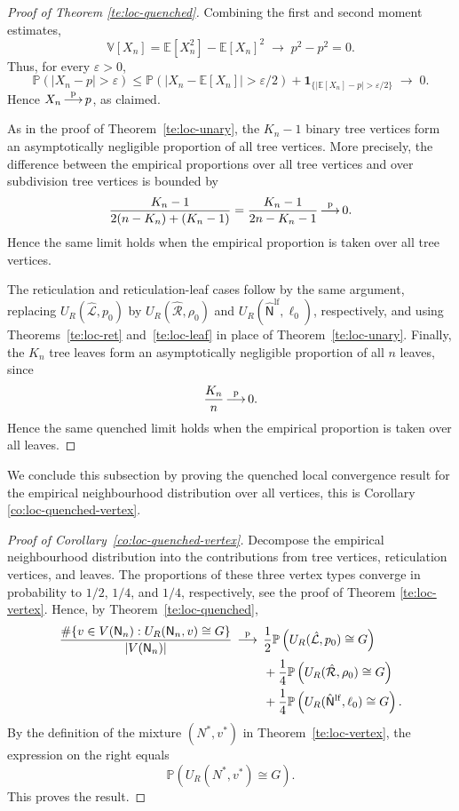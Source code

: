 \documentclass[english,11pt]{smfart}
\newcommand{\Prb}[1]{\mathbb{P}\left(#1\right)}
\newcommand{\Ex}[1]{\mathbb{E}[#1]}
\newcommand{\Va}[1]{\mathbb{V}[#1]}
\newcommand{\convp}{\,{\buildrel \mathrm{p} \over \longrightarrow}\,}
\newcommand{\cL}{\mathcal{L}}
\newcommand{\cR}{\mathcal{R}}
\newcommand{\mN}{\mathsf{N}}
\numberwithin{equation}{section}
\begin{document}
\begin{proof}[Proof of Theorem \ref{te:loc-quenched}]
Combining the first and second moment estimates,
\[
  \Va{X_n}
  =
  \Ex{X_n^2}-\Ex{X_n}^2
  \;\longrightarrow\;p^2-p^2=0.
\]
Thus, for every \(\varepsilon>0\),
\[
  \Prb{|X_n-p|>\varepsilon}
  \le
  \Prb{|X_n-\Ex{X_n}|>\varepsilon/2}
  +
  \mathbf{1}_{\{|\Ex{X_n}-p|>\varepsilon/2\}}
  \;\longrightarrow\;0.
\]
Hence \(X_n\convp p\), as claimed.
\smallskip

As in the proof of Theorem~\ref{te:loc-unary}, the \(K_n-1\) binary tree
vertices form an asymptotically negligible proportion of all tree
vertices. More precisely, the difference between the empirical
proportions over all tree vertices and over subdivision tree vertices is
bounded by
\[
\frac{K_n-1}{2(n-K_n)+(K_n-1)}
=
\frac{K_n-1}{2n-K_n-1}
\convp0.
\]
Hence the same limit holds when the empirical proportion is taken over all
tree vertices.
\smallskip

The reticulation and reticulation-leaf cases follow by the same argument,
replacing \(U_R(\hat{\cL},p_0)\) by \(U_R(\hat{\cR},\rho_0)\) and
\(U_R(\hat{\mN}^{\mathrm{lf}},\ell_0)\), respectively, and using
Theorems~\ref{te:loc-ret} and~\ref{te:loc-leaf} in place of
Theorem~\ref{te:loc-unary}. Finally, the \(K_n\) tree leaves form an
asymptotically negligible proportion of all \(n\) leaves, since
\[
\frac{K_n}{n}\convp0.
\]
Hence the same quenched limit holds when the empirical proportion is taken
over all leaves.
\end{proof}

We conclude this subsection by proving the quenched local convergence
result for the empirical neighbourhood distribution over all vertices, this is Corollary \ref{co:loc-quenched-vertex}.

\begin{proof}[Proof of Corollary~\ref{co:loc-quenched-vertex}]
Decompose the empirical neighbourhood distribution into the contributions
from tree vertices, reticulation vertices, and leaves. The proportions of these three vertex types converge in probability
to \(1/2\), \(1/4\), and \(1/4\), respectively, see the proof of Theorem \ref{te:loc-vertex}. Hence, by
Theorem~\ref{te:loc-quenched},
\[
\begin{aligned}
\frac{\#\{v\in V(\mN_n):U_R(\mN_n,v)\cong G\}}
     {|V(\mN_n)|}
\;\convp\;&
\frac12\Prb{U_R(\hat{\cL},p_0)\cong G}\\
&+\frac14\Prb{U_R(\hat{\cR},\rho_0)\cong G}\\
&+\frac14\Prb{U_R(\hat{\mN}^{\mathrm{lf}},\ell_0)\cong G}.
\end{aligned}
\]
By the definition of the mixture \((N^*,v^*)\) in
Theorem~\ref{te:loc-vertex}, the expression on the right equals
\[
\Prb{U_R(N^*,v^*)\cong G}.
\]
This proves the result.
\end{proof}
\end{document}
